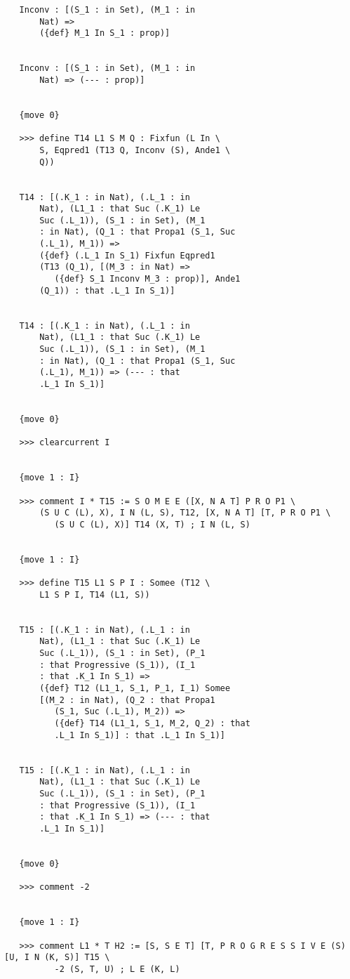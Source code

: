 \documentclass{article}
\begin{document}
\begin{verbatim}
   Inconv : [(S_1 : in Set), (M_1 : in 
       Nat) => 
       ({def} M_1 In S_1 : prop)]


   Inconv : [(S_1 : in Set), (M_1 : in 
       Nat) => (--- : prop)]


   {move 0}

   >>> define T14 L1 S M Q : Fixfun (L In \
       S, Eqpred1 (T13 Q, Inconv (S), Ande1 \
       Q))


   T14 : [(.K_1 : in Nat), (.L_1 : in 
       Nat), (L1_1 : that Suc (.K_1) Le 
       Suc (.L_1)), (S_1 : in Set), (M_1 
       : in Nat), (Q_1 : that Propa1 (S_1, Suc 
       (.L_1), M_1)) => 
       ({def} (.L_1 In S_1) Fixfun Eqpred1 
       (T13 (Q_1), [(M_3 : in Nat) => 
          ({def} S_1 Inconv M_3 : prop)], Ande1 
       (Q_1)) : that .L_1 In S_1)]


   T14 : [(.K_1 : in Nat), (.L_1 : in 
       Nat), (L1_1 : that Suc (.K_1) Le 
       Suc (.L_1)), (S_1 : in Set), (M_1 
       : in Nat), (Q_1 : that Propa1 (S_1, Suc 
       (.L_1), M_1)) => (--- : that 
       .L_1 In S_1)]


   {move 0}

   >>> clearcurrent I


   {move 1 : I}

   >>> comment I * T15 := S O M E E ([X, N A T] P R O P1 \
       (S U C (L), X), I N (L, S), T12, [X, N A T] [T, P R O P1 \
          (S U C (L), X)] T14 (X, T) ; I N (L, S)


   {move 1 : I}

   >>> define T15 L1 S P I : Somee (T12 \
       L1 S P I, T14 (L1, S))


   T15 : [(.K_1 : in Nat), (.L_1 : in 
       Nat), (L1_1 : that Suc (.K_1) Le 
       Suc (.L_1)), (S_1 : in Set), (P_1 
       : that Progressive (S_1)), (I_1 
       : that .K_1 In S_1) => 
       ({def} T12 (L1_1, S_1, P_1, I_1) Somee 
       [(M_2 : in Nat), (Q_2 : that Propa1 
          (S_1, Suc (.L_1), M_2)) => 
          ({def} T14 (L1_1, S_1, M_2, Q_2) : that 
          .L_1 In S_1)] : that .L_1 In S_1)]


   T15 : [(.K_1 : in Nat), (.L_1 : in 
       Nat), (L1_1 : that Suc (.K_1) Le 
       Suc (.L_1)), (S_1 : in Set), (P_1 
       : that Progressive (S_1)), (I_1 
       : that .K_1 In S_1) => (--- : that 
       .L_1 In S_1)]


   {move 0}

   >>> comment -2


   {move 1 : I}

   >>> comment L1 * T H2 := [S, S E T] [T, P R O G R E S S I V E (S) [U, I N (K, S)] T15 \
          -2 (S, T, U) ; L E (K, L)



\end{verbatim}
\end{document}
